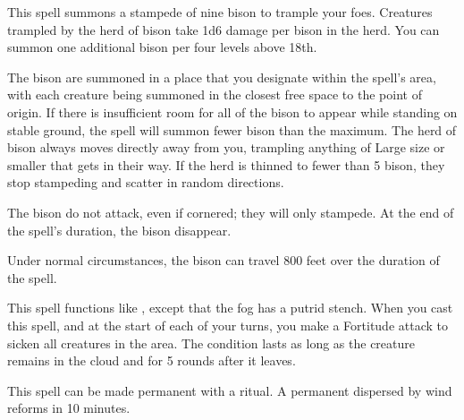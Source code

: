 \spellrng{\rngfar}
\begin{spelleffect}
  This spell summons a stampede of nine bison to trample your foes. Creatures trampled by the herd of bison take 1d6 damage per bison in the herd. You can summon one additional bison per four levels above 18th.
  \par The bison are summoned in a place that you designate within the spell's area, with each creature being summoned in the closest free space to the point of origin. If there is insufficient room for all of the bison to appear while standing on stable ground, the spell will summon fewer bison than the maximum. The herd of bison always moves directly away from you, trampling anything of Large size or smaller that gets in their way. If the herd is thinned to fewer than 5 bison, they stop stampeding and scatter in random directions.
  \par The bison do not attack, even if cornered; they will only stampede. At the end of the spell's duration, the bison disappear.
\end{spelleffect}
\begin{spellnotes}
  Under normal circumstances, the bison can travel 800 feet over the duration of the spell.
\end{spellnotes}

\begin{spelleffect}
  This spell functions like , except that the fog has a putrid stench. When you cast this spell, and at the start of each of your turns, you make a Fortitude attack to sicken all creatures in the area. The condition lasts as long as the creature remains in the cloud and for 5 rounds after it leaves.
\end{spelleffect}
\begin{spellnotes}
   This spell can be made permanent with a  ritual. A permanent  dispersed by wind reforms in 10 minutes.
\end{spellnotes}

